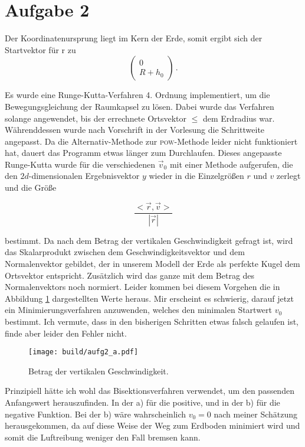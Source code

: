 \section*{Aufgabe 2}
Der Koordinatenursprung liegt im Kern der Erde, somit ergibt sich der Startvektor für
r zu
\begin{equation*}
  \begin{pmatrix}
    0 \\
    R+h_0
  \end{pmatrix} \, .
\end{equation*}

Es wurde eine Runge-Kutta-Verfahren 4. Ordnung implementiert, um die
Bewegungsgleichung der Raumkapsel zu lösen. Dabei wurde das Verfahren solange
angewendet, bis der errechnete Ortsvektor $\leq$ dem Erdradius war.
Währenddessen wurde nach Vorschrift in der Vorlesung die Schrittweite angepasst.
Da die Alternativ-Methode zur \textsc{pow}-Methode leider nicht funktioniert
hat, dauert das Programm etwas länger zum Durchlaufen. Dieses angepasste
Runge-Kutta wurde für die verschiedenen $\vec{v}_0$ mit einer Methode
aufgerufen, die den $2d$-dimensionalen Ergebnisvektor $y$ wieder in die
Einzelgrößen $r$ und $v$ zerlegt und die Größe

\begin{equation*}
  \frac{<\vec{r}, \vec{v}>}{|\vec{r}|}
\end{equation*}

bestimmt. Da nach dem Betrag der vertikalen Geschwindigkeit gefragt ist, wird
das Skalarprodukt zwischen dem Geschwindigkeitsvektor und dem Normalenvektor gebildet,
der in unserem Modell der Erde als perfekte Kugel dem Ortsvektor entspricht. Zusätzlich
wird das ganze mit dem Betrag des Normalenvektors noch normiert. Leider kommen bei
diesem Vorgehen die in Abbildung \ref{fig:norm} dargestellten Werte heraus.
Mir erscheint es schwierig, darauf jetzt ein Minimierungsverfahren anzuwenden,
welches den minimalen Startwert $v_0$ bestimmt. Ich vermute, dass in den bisherigen Schritten
etwas falsch gelaufen ist, finde aber leider den Fehler nicht.

\begin{figure}
  \centering
  \texttt{[image: build/aufg2\_a.pdf]}
  \caption{Betrag der vertikalen Geschwindigkeit.}
  \label{fig:norm}
\end{figure}

Prinzipiell hätte ich wohl das Bisektionsverfahren verwendet, um den passenden
Anfangswert herauszufinden. In der a) für die positive, und in der b) für die negative
Funktion. Bei der b) wäre wahrscheinlich $v_0 = 0$ nach meiner Schätzung herausgekommen,
da auf diese Weise der Weg zum Erdboden minimiert wird und somit die Luftreibung
weniger den Fall bremsen kann.

